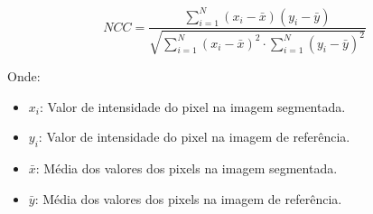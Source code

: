 \begin{itemize}
    \[
    NCC = \frac{\sum_{i=1}^{N} (x_i - \bar{x})(y_i - \bar{y})}{\sqrt{\sum_{i=1}^{N} (x_i - \bar{x})^2 \cdot \sum_{i=1}^{N} (y_i - \bar{y})^2}}
    \]

    Onde:
    \begin{itemize}
        \item \( x_i \): Valor de intensidade do pixel na imagem segmentada.
        \item \( y_i \): Valor de intensidade do pixel na imagem de referência.
        \item \( \bar{x} \): Média dos valores dos pixels na imagem segmentada.
        \item \( \bar{y} \): Média dos valores dos pixels na imagem de referência.
    \end{itemize}
\end{itemize}